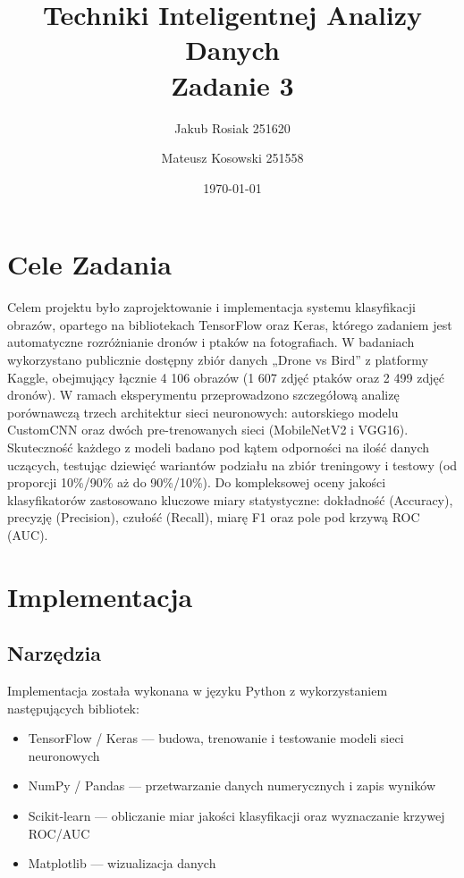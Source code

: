 \documentclass[12pt,a4paper]{report}
\title{Techniki Inteligentnej Analizy Danych\\[0.5em]\large Zadanie 3}
\author{
    Jakub Rosiak 251620
    \and
    Mateusz Kosowski 251558    
}
\date{\today}
\begin{document}

\maketitle

\tableofcontents

\chapter{Cele Zadania}

Celem projektu było zaprojektowanie i implementacja systemu klasyfikacji obrazów, opartego na bibliotekach TensorFlow oraz Keras, którego zadaniem jest automatyczne rozróżnianie dronów i ptaków na fotografiach. W badaniach wykorzystano publicznie dostępny zbiór danych „Drone vs Bird” z platformy Kaggle, obejmujący łącznie 4 106 obrazów (1 607 zdjęć ptaków oraz 2 499 zdjęć dronów).
W ramach eksperymentu przeprowadzono szczegółową analizę porównawczą trzech architektur sieci neuronowych: autorskiego modelu CustomCNN oraz dwóch pre-trenowanych sieci (MobileNetV2 i VGG16). Skuteczność każdego z modeli badano pod kątem odporności na ilość danych uczących, testując dziewięć wariantów podziału na zbiór treningowy i testowy (od proporcji 10\%/90\% aż do 90\%/10\%). Do kompleksowej oceny jakości klasyfikatorów zastosowano kluczowe miary statystyczne: dokładność (Accuracy), precyzję (Precision), czułość (Recall), miarę F1 oraz pole pod krzywą ROC (AUC).

\chapter{Implementacja}

\section{Narzędzia}
Implementacja została wykonana w języku Python z wykorzystaniem następujących bibliotek:

\begin{itemize}
    \item TensorFlow / Keras — budowa, trenowanie i testowanie modeli sieci neuronowych
    \item NumPy / Pandas — przetwarzanie danych numerycznych i zapis wyników
    \item Scikit-learn — obliczanie miar jakości klasyfikacji oraz wyznaczanie krzywej ROC/AUC
    \item Matplotlib — wizualizacja danych
\end{itemize}
\end{document}
